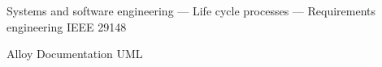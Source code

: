 Systems and software engineering — Life cycle processes — Requirements engineering IEEE 29148

Alloy Documentation
UML

